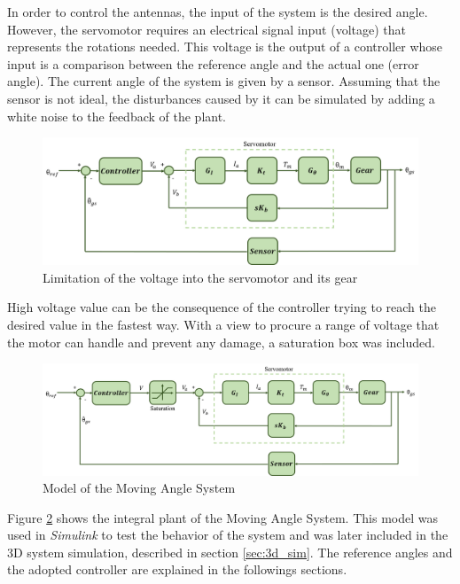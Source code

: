 In order to control the antennas, the input of the system is the desired angle. However, the servomotor requires an electrical signal input (voltage) that represents the rotations needed. This voltage is the output of a controller whose input is a comparison between the reference angle and the actual one (error angle). The current angle of the system is given by a sensor.
Assuming that the sensor is not ideal, the disturbances caused by it can be simulated by adding a white noise to the feedback of the plant.

\begin{figure}[H]
\centering
\includegraphics[scale=0.5]{figures/servo+gear+noise.png}
\caption{Limitation of the voltage into the servomotor and its gear}
\label{model4}
\end{figure}

High voltage value can be the consequence of the controller trying to reach the desired value in the fastest way. With a view to procure a range of voltage that the motor can handle and prevent any damage, a saturation box was included.

\begin{figure}[H]
\centering
\includegraphics[scale=0.4]{figures/complete_model.png}
\caption{Model of the Moving Angle System}
\label{model4}
\end{figure}

Figure \ref{model4} shows the integral plant of the Moving Angle System. This model was used in \emph{Simulink} to test the behavior of the system and was later included in the 3D system simulation, described in section \ref{sec:3d_sim}. The reference angles and the adopted controller are explained in the followings sections.